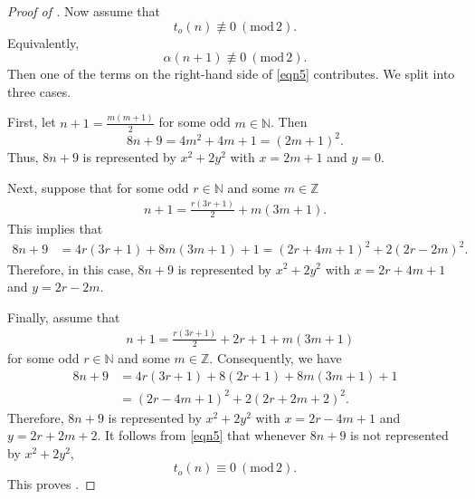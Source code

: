 \documentclass[12pt,reqno]{amsart}
\renewcommand{\a}{\alpha}
\renewcommand{\(}{\left\(}
\renewcommand{\)}{\right\)}
\numberwithin{equation}{section}
\theoremstyle{plain}
\theoremstyle{definition}
\numberwithin{equation}{section}
\renewcommand{\pmod}[1]{\ \left( \mathrm{mod} \, #1 \right)}
\begin{document}
\begin{proof}[Proof of ]
Now assume that 
\[
t_o(n)\not\equiv 0\pmod{2}.%
\]
Equivalently,
\[
\a(n+1)\not\equiv 0\pmod{2}.
\]
Then one of the terms on the right-hand side of \eqref{eqn5} contributes. We split into three cases.

 First, let $n+1=\frac{m(m+1)}{2}$ for some odd $m\in \mathbb{N}$. Then %
\[
 8n+9=4m^2+4m+1=(2m+1)^2.
\]
Thus, $8n+9$ is represented by $x^2+2y^2$ with $x=2m+1$ and $y=0$.  

Next, suppose that for some odd $r\in \mathbb{N}$ and some $m\in \mathbb{Z}$
\begin{align*}
n+1=\frac{r(3r+1)}{2}+m(3m+1).
\end{align*}
This implies that
\begin{align*}
 8n+9&=4r(3r+1)+8m(3m+1)+1=\left(2r+4m+1\right)^2+2\left(2r-2m\right)^2.
\end{align*}
Therefore, in this case, $8n+9$ is represented by $x^2+2y^2$ with $x=2r+4m+1$ and $y=2r-2m$.

Finally, assume that %
\begin{align*}
&n+1=\frac{r(3r+1)}{2}+2r+1+m(3m+1)
\end{align*}
for some odd $r\in \mathbb{N}$ and some $m\in \mathbb{Z}$. Consequently, we have
\begin{align*}
8n+9&=4r(3r+1)+8(2r+1)+8m(3m+1)+1\\
&=\left(2r-4m+1\right)^2+2\left(2r+2m+2\right)^2.
\end{align*}
Therefore, $8n+9$ is represented by $x^2+2y^2$ with $x=2r-4m+1$ and $y=2r+2m+2$. It follows from \eqref{eqn5} that whenever $8n+9$ is not represented by $x^2+2y^2$,
\[
t_o(n)\equiv 0\pmod{2}.
\]
This proves .\qedhere 
\end{proof}











 
\end{document}
